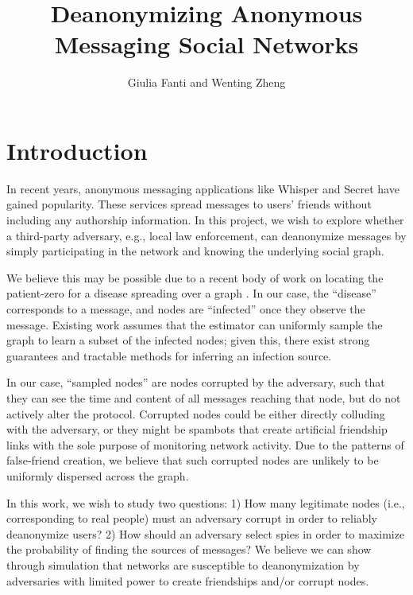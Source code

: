 \documentclass[10pt, twocolumn]{article}
\begin{document}
\title{Deanonymizing Anonymous Messaging Social Networks}

\author{Giulia Fanti and Wenting Zheng}

   \date{}
   \maketitle
   \thispagestyle{empty}
\section{Introduction}
In recent years, anonymous messaging applications like Whisper and Secret have gained popularity. These services spread messages to users’ friends without including any authorship information. In this project, we wish to explore whether a third-party adversary, e.g., local law enforcement, can deanonymize messages by simply participating in the network and knowing the underlying social graph. 

We believe this may be possible due to a recent body of work on locating the patient-zero for a disease spreading over a graph \cite{shah2011rumors}. In our case, the “disease” corresponds to a message, and nodes are ``infected” once they observe the message. Existing work assumes that the estimator can uniformly sample the graph to learn a subset of the infected nodes; given this, there exist strong guarantees and tractable methods for inferring an infection source.

In our case, ``sampled nodes” are nodes corrupted by the adversary, such that they can see the time and content of all messages reaching that node, but do not actively alter the protocol. Corrupted nodes could be either directly colluding with the adversary, or they might be spambots that create artificial friendship links with the sole purpose of monitoring network activity. Due to the patterns of false-friend creation, we believe that such corrupted nodes are unlikely to be uniformly dispersed across the graph. 

In this work, we wish to study two questions: 1) How many legitimate nodes (i.e., corresponding to real people) must an adversary corrupt in order to reliably deanonymize users? 2) How should an adversary select spies in order to maximize the probability of finding the sources of messages? We believe we can show through simulation that networks are susceptible to deanonymization by adversaries with limited power to create friendships and/or corrupt nodes.
\end{document}
